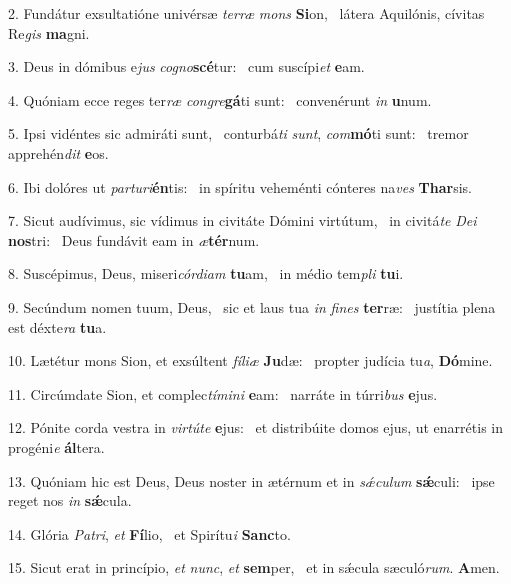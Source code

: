 2. Fundátur exsultatióne univérsæ \textit{ter}\textit{ræ} \textit{mons} \textbf{Si}on, \ast\  látera Aquilónis, cívitas Re\textit{gis} \textbf{ma}gni.\

3. Deus in dómibus e\textit{jus} \textit{co}\textit{gno}\textbf{scé}tur: \ast\  cum suscípi\textit{et} \textbf{e}am.\

4. Quóniam ecce reges ter\textit{ræ} \textit{con}\textit{gre}\textbf{gá}ti sunt: \ast\  convenérunt \textit{in} \textbf{u}num.\

5. Ipsi vidéntes sic admiráti sunt, \dag\  conturbá\textit{ti} \textit{sunt}, \textit{com}\textbf{mó}ti sunt: \ast\  tremor apprehén\textit{dit} \textbf{e}os.\

6. Ibi dolóres ut \textit{par}\textit{tu}\textit{ri}\textbf{én}tis: \ast\  in spíritu veheménti cónteres na\textit{ves} \textbf{Thar}sis.\

7. Sicut audívimus, sic vídimus in civitáte Dómini virtútum, \dag\  in civitá\textit{te} \textit{De}\textit{i} \textbf{nos}tri: \ast\  Deus fundávit eam in \textit{æ}\textbf{tér}num.\

8. Suscépimus, Deus, miseri\textit{cór}\textit{di}\textit{am} \textbf{tu}am, \ast\  in médio tem\textit{pli} \textbf{tu}i.\

9. Secúndum nomen tuum, Deus, \dag\  sic et laus tua \textit{in} \textit{fi}\textit{nes} \textbf{ter}ræ: \ast\  justítia plena est déxte\textit{ra} \textbf{tu}a.\

10. Lætétur mons Sion, et exsúltent \textit{fí}\textit{li}\textit{æ} \textbf{Ju}dæ: \ast\  propter judícia tu\textit{a}, \textbf{Dó}mine.\

11. Circúmdate Sion, et complec\textit{tí}\textit{mi}\textit{ni} \textbf{e}am: \ast\  narráte in túrri\textit{bus} \textbf{e}jus.\

12. Pónite corda vestra in \textit{vir}\textit{tú}\textit{te} \textbf{e}jus: \ast\  et distribúite domos ejus, ut enarrétis in progéni\textit{e} \textbf{ál}tera.\

13. Quóniam hic est Deus, Deus noster in ætérnum et in \textit{sǽ}\textit{cu}\textit{lum} \textbf{sǽ}culi: \ast\  ipse reget nos \textit{in} \textbf{sǽ}cula.\

14. Glória \textit{Pa}\textit{tri}, \textit{et} \textbf{Fí}lio, \ast\  et Spirítu\textit{i} \textbf{Sanc}to.\

15. Sicut erat in princípio, \textit{et} \textit{nunc}, \textit{et} \textbf{sem}per, \ast\  et in sǽcula sæculó\textit{rum}. \textbf{A}men.\

